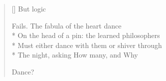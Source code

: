 \label{ch:lear_bi}
\settowidth{\versewidth}{On the head of a pin: the learned philosophers}
\begin{verse}[\versewidth]
 \hspace*{6\vgap} But logic

Fails. The fabula of the heart dance\\*
On the head of a pin: the learned philosophers\\*
Must either dance with them or shiver through\\*
The night, asking How many, and Why

Dance?
\end{verse}
